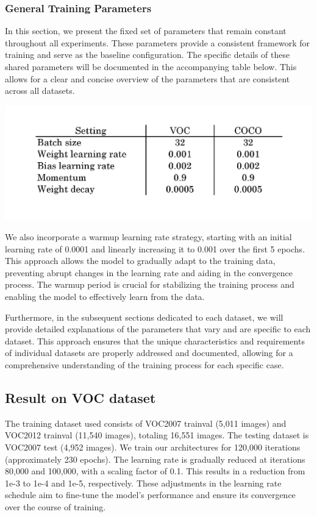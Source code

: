 \documentclass[a4paper]{article}
\begin{document}
\subsubsection{General Training Parameters}

	In this section, we present the fixed set of parameters that remain constant throughout all experiments. These parameters provide a consistent framework for training and serve as the baseline configuration. The specific details of these shared parameters will be documented in the accompanying table below. This allows for a clear and concise overview of the parameters that are consistent across all datasets.
	
	
\begin{center}
	\includegraphics[width=0.7\linewidth]{"../fig/Training setting"}
\end{center}

	We also incorporate a warmup learning rate strategy, starting with an initial learning rate of 0.0001 and linearly increasing it to 0.001 over the first 5 epochs. This approach allows the model to gradually adapt to the training data, preventing abrupt changes in the learning rate and aiding in the convergence process. The warmup period is crucial for stabilizing the training process and enabling the model to effectively learn from the data.

	Furthermore, in the subsequent sections dedicated to each dataset, we will provide detailed explanations of the parameters that vary and are specific to each dataset. This approach ensures that the unique characteristics and requirements of individual datasets are properly addressed and documented, allowing for a comprehensive understanding of the training process for each specific case.
	
	\subsection{Result on VOC dataset}
	The training dataset used consists of VOC2007 trainval (5,011 images) and VOC2012 trainval (11,540 images), totaling 16,551 images. The testing dataset is VOC2007 test (4,952 images). We train our architectures for 120,000 iterations (approximately 230 epochs). The learning rate is gradually reduced at iterations 80,000 and 100,000, with a scaling factor of 0.1. This results in a reduction from 1e-3 to 1e-4 and 1e-5, respectively. These adjustments in the learning rate schedule aim to fine-tune the model's performance and ensure its convergence over the course of training.
	
\end{document}
